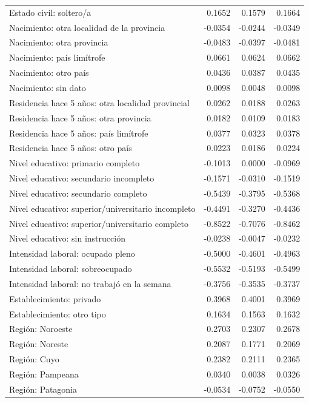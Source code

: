 \begin{longtable}{p{7cm}rrr}
Estado civil: soltero/a & 0.1652 & 0.1579 & 0.1664 \\
Nacimiento: otra localidad de la provincia & -0.0354 & -0.0244 & -0.0349 \\
Nacimiento: otra provincia & -0.0483 & -0.0397 & -0.0481 \\
Nacimiento: país limítrofe & 0.0661 & 0.0624 & 0.0662 \\
Nacimiento: otro país & 0.0436 & 0.0387 & 0.0435 \\
Nacimiento: sin dato & 0.0098 & 0.0048 & 0.0098 \\
Residencia hace 5 años: otra localidad provincial & 0.0262 & 0.0188 & 0.0263 \\
Residencia hace 5 años: otra provincia & 0.0182 & 0.0109 & 0.0183 \\
Residencia hace 5 años: país limítrofe & 0.0377 & 0.0323 & 0.0378 \\
Residencia hace 5 años: otro país & 0.0223 & 0.0186 & 0.0224 \\
Nivel educativo: primario completo & -0.1013 & 0.0000 & -0.0969 \\
Nivel educativo: secundario incompleto & -0.1571 & -0.0310 & -0.1519 \\
Nivel educativo: secundario completo & -0.5439 & -0.3795 & -0.5368 \\
Nivel educativo: superior/universitario incompleto & -0.4491 & -0.3270 & -0.4436 \\
Nivel educativo: superior/universitario completo & -0.8522 & -0.7076 & -0.8462 \\
Nivel educativo: sin instrucción & -0.0238 & -0.0047 & -0.0232 \\
Intensidad laboral: ocupado pleno & -0.5000 & -0.4601 & -0.4963 \\
Intensidad laboral: sobreocupado & -0.5532 & -0.5193 & -0.5499 \\
Intensidad laboral: no trabajó en la semana & -0.3756 & -0.3535 & -0.3737 \\
Establecimiento: privado & 0.3968 & 0.4001 & 0.3969 \\
Establecimiento: otro tipo & 0.1634 & 0.1563 & 0.1632 \\
Región: Noroeste & 0.2703 & 0.2307 & 0.2678 \\
Región: Noreste & 0.2087 & 0.1771 & 0.2069 \\
Región: Cuyo & 0.2382 & 0.2111 & 0.2365 \\
Región: Pampeana & 0.0340 & 0.0038 & 0.0326 \\
Región: Patagonia & -0.0534 & -0.0752 & -0.0550 \\

\end{longtable}
